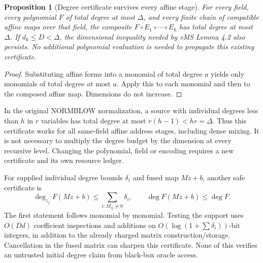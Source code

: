 \documentclass[11pt]{article}
\newtheorem{proposition}{Proposition}
\begin{document}
\begin{proposition}[Degree certificate survives every affine stage]
For every field, every polynomial $F$ of total degree at most $\Delta$,
and every finite chain of compatible affine maps over that field, the
composite $F\circ E_1\circ\cdots\circ E_k$ has total degree at most
$\Delta$. If $d_k\le D<\Delta$, the dimensional inequality needed by
vMS Lemma 4.2 also persists. No additional polynomial evaluation is needed
to propagate this existing certificate.
\end{proposition}
\begin{proof}
Substituting affine forms into a monomial of total degree $a$ yields
only monomials of total degree at most $a$. Apply this to each monomial
and then to the composed affine map. Dimensions do not increase.
\end{proof}
In the original NORMBLOW normalization, a source with individual degrees
less than $h$ in $r$ variables has total degree at most $r(h-1)<hr=\Delta$.
Thus this certificate works for all same-field affine address stages,
including dense mixing. It is not necessary to multiply the degree budget
by the dimension at every recursive level. Changing the polynomial,
field or encoding requires a new certificate and its own resource ledger.

For supplied individual degree bounds $\delta_i$ and fused map $Mz+b$,
another safe certificate is
\[
 \deg_{z_j}F(Mz+b)\le\sum_{i:M_{ij}\ne0}\delta_i,
 \qquad \deg F(Mz+b)\le\deg F.
\]
The first statement follows monomial by monomial. Testing the support
uses $O(Dd)$ coefficient inspections and additions on $O(\log(1+\sum
\delta_i))$-bit integers, in addition to the already charged matrix
construction/storage. Cancellation in the fused matrix can sharpen this
certificate. None of this verifies an untrusted initial degree claim
from black-box oracle access.
\end{document}
